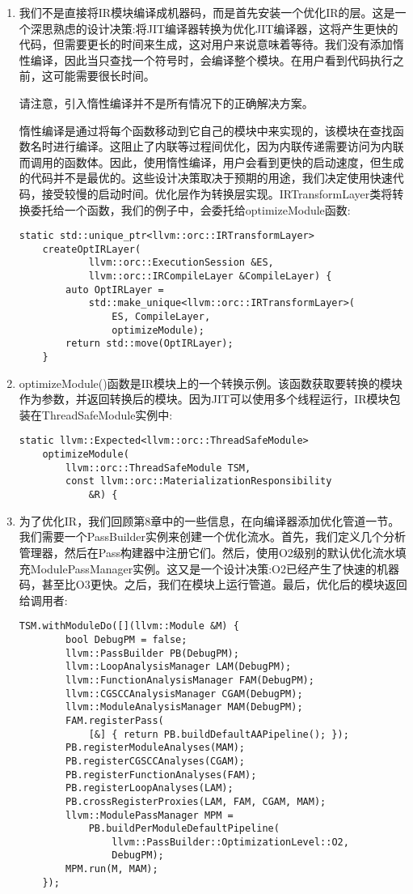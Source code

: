 \begin{enumerate}
\item 我们不是直接将IR模块编译成机器码，而是首先安装一个优化IR的层。这是一个深思熟虑的设计决策:将JIT编译器转换为优化JIT编译器，这将产生更快的代码，但需要更长的时间来生成，这对用户来说意味着等待。我们没有添加惰性编译，因此当只查找一个符号时，会编译整个模块。在用户看到代码执行之前，这可能需要很长时间。

\begin{tcolorbox}[colback=blue!5!white,colframe=blue!75!black, title=Note]
请注意，引入惰性编译并不是所有情况下的正确解决方案。
\end{tcolorbox}

惰性编译是通过将每个函数移动到它自己的模块中来实现的，该模块在查找函数名时进行编译。这阻止了内联等过程间优化，因为内联传递需要访问为内联而调用的函数体。因此，使用惰性编译，用户会看到更快的启动速度，但生成的代码并不是最优的。这些设计决策取决于预期的用途，我们决定使用快速代码，接受较慢的启动时间。优化层作为转换层实现。IRTransformLayer类将转换委托给一个函数，我们的例子中，会委托给optimizeModule函数:
\begin{lstlisting}[caption={}]
	static std::unique_ptr<llvm::orc::IRTransformLayer>
	createOptIRLayer(
			llvm::orc::ExecutionSession &ES,
			llvm::orc::IRCompileLayer &CompileLayer) {
		auto OptIRLayer =
			std::make_unique<llvm::orc::IRTransformLayer>(
				ES, CompileLayer,
				optimizeModule);
		return std::move(OptIRLayer);
	}
\end{lstlisting}

\item optimizeModule()函数是IR模块上的一个转换示例。该函数获取要转换的模块作为参数，并返回转换后的模块。因为JIT可以使用多个线程运行，IR模块包装在ThreadSafeModule实例中:
\begin{lstlisting}[caption={}]
	static llvm::Expected<llvm::orc::ThreadSafeModule>
	optimizeModule(
		llvm::orc::ThreadSafeModule TSM,
		const llvm::orc::MaterializationResponsibility
			&R) {
\end{lstlisting}

\item 为了优化IR，我们回顾第8章中的一些信息，在向编译器添加优化管道一节。我们需要一个PassBuilder实例来创建一个优化流水。首先，我们定义几个分析管理器，然后在Pass构建器中注册它们。然后，使用O2级别的默认优化流水填充ModulePassManager实例。这又是一个设计决策:O2已经产生了快速的机器码，甚至比O3更快。之后，我们在模块上运行管道。最后，优化后的模块返回给调用者:
\begin{lstlisting}[caption={}]
	TSM.withModuleDo([](llvm::Module &M) {
		bool DebugPM = false;
		llvm::PassBuilder PB(DebugPM);
		llvm::LoopAnalysisManager LAM(DebugPM);
		llvm::FunctionAnalysisManager FAM(DebugPM);
		llvm::CGSCCAnalysisManager CGAM(DebugPM);
		llvm::ModuleAnalysisManager MAM(DebugPM);
		FAM.registerPass(
			[&] { return PB.buildDefaultAAPipeline(); });
		PB.registerModuleAnalyses(MAM);
		PB.registerCGSCCAnalyses(CGAM);
		PB.registerFunctionAnalyses(FAM);
		PB.registerLoopAnalyses(LAM);
		PB.crossRegisterProxies(LAM, FAM, CGAM, MAM);
		llvm::ModulePassManager MPM =
			PB.buildPerModuleDefaultPipeline(
				llvm::PassBuilder::OptimizationLevel::O2,
				DebugPM);
		MPM.run(M, MAM);
	});


\end{lstlisting}
\end{enumerate}
